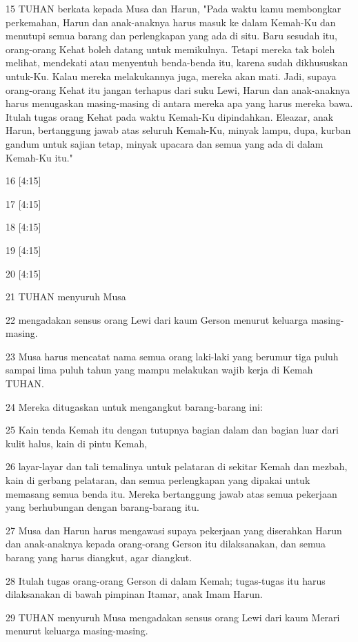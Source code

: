 \par 15 TUHAN berkata kepada Musa dan Harun, "Pada waktu kamu membongkar perkemahan, Harun dan anak-anaknya harus masuk ke dalam Kemah-Ku dan menutupi semua barang dan perlengkapan yang ada di situ. Baru sesudah itu, orang-orang Kehat boleh datang untuk memikulnya. Tetapi mereka tak boleh melihat, mendekati atau menyentuh benda-benda itu, karena sudah dikhususkan untuk-Ku. Kalau mereka melakukannya juga, mereka akan mati. Jadi, supaya orang-orang Kehat itu jangan terhapus dari suku Lewi, Harun dan anak-anaknya harus menugaskan masing-masing di antara mereka apa yang harus mereka bawa. Itulah tugas orang Kehat pada waktu Kemah-Ku dipindahkan. Eleazar, anak Harun, bertanggung jawab atas seluruh Kemah-Ku, minyak lampu, dupa, kurban gandum untuk sajian tetap, minyak upacara dan semua yang ada di dalam Kemah-Ku itu."
\par 16 [4:15]
\par 17 [4:15]
\par 18 [4:15]
\par 19 [4:15]
\par 20 [4:15]
\par 21 TUHAN menyuruh Musa
\par 22 mengadakan sensus orang Lewi dari kaum Gerson menurut keluarga masing-masing.
\par 23 Musa harus mencatat nama semua orang laki-laki yang berumur tiga puluh sampai lima puluh tahun yang mampu melakukan wajib kerja di Kemah TUHAN.
\par 24 Mereka ditugaskan untuk mengangkut barang-barang ini:
\par 25 Kain tenda Kemah itu dengan tutupnya bagian dalam dan bagian luar dari kulit halus, kain di pintu Kemah,
\par 26 layar-layar dan tali temalinya untuk pelataran di sekitar Kemah dan mezbah, kain di gerbang pelataran, dan semua perlengkapan yang dipakai untuk memasang semua benda itu. Mereka bertanggung jawab atas semua pekerjaan yang berhubungan dengan barang-barang itu.
\par 27 Musa dan Harun harus mengawasi supaya pekerjaan yang diserahkan Harun dan anak-anaknya kepada orang-orang Gerson itu dilaksanakan, dan semua barang yang harus diangkut, agar diangkut.
\par 28 Itulah tugas orang-orang Gerson di dalam Kemah; tugas-tugas itu harus dilaksanakan di bawah pimpinan Itamar, anak Imam Harun.
\par 29 TUHAN menyuruh Musa mengadakan sensus orang Lewi dari kaum Merari menurut keluarga masing-masing.

